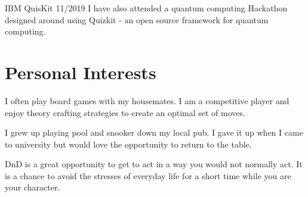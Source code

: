 \documentclass[11pt]{article} %
\begin{document}
\begin{paracol}{2}

\workposition{} %
{IBM QuisKit} %
{11/2019} %
{} %
{} %
{I have also attended a quantum computing Hackathon designed around using Quizkit - an open source
framework for quantum computing.}  %



\section{Personal Interests}
{I often play board games with my housemates. I am a competitive player and enjoy theory crafting 
strategies to create an optimal set of moves.}

{I grew up playing pool and snooker down my local pub. I gave it up when I came to university but
would love the opportunity to return to the table.}

{DnD is a great opportunity to get to act in a way you would not normally act. It is a chance to
avoid the stresses of everyday life for a short time while you are your character.}
\end{paracol}

\end{document}
